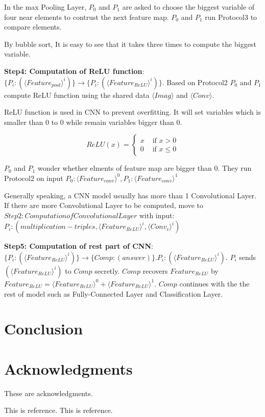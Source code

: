 \documentclass[11pt,twoside,a4paper]{article}
\begin{document}
In the max Pooling Layer, $P_{0}$ and $P_{1}$ are asked to choose the biggest variable of four near elements to contrust the next feature map.
$P_{0}$ and $P_{1}$ run Protocol3 to compare elements.

By bubble sort, It is easy to see that it takes three times to compute the biggest variable.


\textbf{Step4: Computation of ReLU function}: $\{P_{i}:(\langle Feature_{pool}\rangle ^{i})\}\rightarrow \{P_{i}:(\langle Feature_{ReLU}\rangle ^{i})\}$.
Based on Protocol2 $P_{0}$ and $P_{1}$ compute ReLU function using the shared data $\langle Imag\rangle $ and $\langle Conv\rangle $. 

ReLU function is used in CNN to prevent overfitting. It will set variables which is smaller than 0 to 0 while remain variables bigger than 0.

$$ReLU(x)=\begin{cases}
	x & \text{ if } x > 0 \\ 
	0 & \text{ if } x \leqslant 0  
	\end{cases}$$

$P_{0}$ and $P_{1}$ wonder whether elments of feature map are bigger than 0. They run Protocol2 on input $P_{0}: \langle Feature_{conv}\rangle ^{0},P_{1}:\langle Feature_{conv}\rangle ^{1}$


Generally speaking, a CNN model usually has more than 1 Convolutional Layer. If there are more Convolutional Layer to be computed, 
move to $Step2: Computation of Convolutional Layer$ with input:$P_{i}:(multiplication-triples, \langle Feature_{ReLU}\rangle ^{i}, \langle Conv_{c}\rangle ^{i})$

\textbf{Step5: Computation of rest part of CNN}: $\{P_{i}:(\langle Feature_{ReLU}\rangle ^{i})\}\rightarrow \{Comp:(answer)\}$.$P_{i}:(\langle Feature_{ReLU}\rangle ^{i})$.
$P_{i}$ sends $(\langle Feature_{ReLU}\rangle ^{i})$ to $Comp$ secretly. $Comp$ recovers $Feature_{ReLU}$ by $Feature_{ReLU}=\langle Feature_{ReLU}\rangle ^{0}+\langle Feature_{ReLU}\rangle ^{1}$. 
$Comp$ continues with the the rest of model such as Fully-Connected Layer and Classification Layer.



\section{Conclusion}

\section*{Acknowledgments}
These are acknowledgments. 
\begin{thebibliography}{100}%
	This is reference.%
	This is reference.%
\end{thebibliography}
\end{document}
